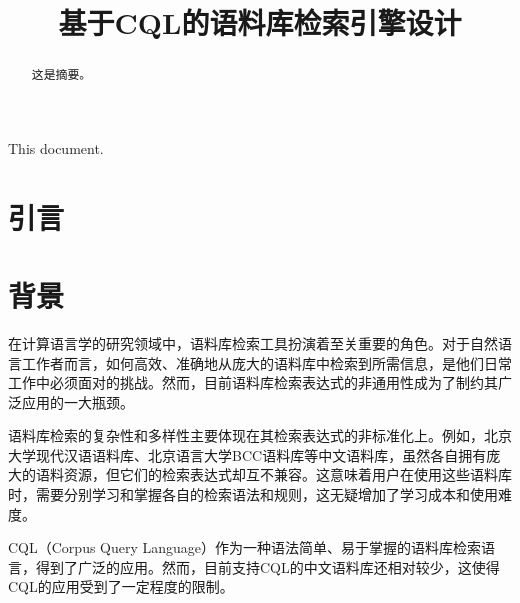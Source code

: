 \documentclass[11pt]{article}
\title{基于CQL的语料库检索引擎设计}
\date{}
\begin{document}
\begin{CJK*}{UTF8}{gbsn}
\setlength{\parindent}{2em}

\maketitle
\begin{abstract}
  这是摘要。
\end{abstract}

\makeenglishtitle
\begin{englishabstract}
  This document.
  
\end{englishabstract}


\section{引言}
\label{intro}

%
%

\section{背景}
\label{backgound}

在计算语言学的研究领域中，语料库检索工具扮演着至关重要的角色。对于自然语言工作者而言，如何高效、准确地从庞大的语料库中检索到所需信息，是他们日常工作中必须面对的挑战。然而，目前语料库检索表达式的非通用性成为了制约其广泛应用的一大瓶颈。

语料库检索的复杂性和多样性主要体现在其检索表达式的非标准化上。例如，北京大学现代汉语语料库、北京语言大学BCC语料库等中文语料库，虽然各自拥有庞大的语料资源，但它们的检索表达式却互不兼容。这意味着用户在使用这些语料库时，需要分别学习和掌握各自的检索语法和规则，这无疑增加了学习成本和使用难度。

CQL（Corpus Query Language）作为一种语法简单、易于掌握的语料库检索语言，得到了广泛的应用。然而，目前支持CQL的中文语料库还相对较少，这使得CQL的应用受到了一定程度的限制。


\end{CJK*}
\end{document}
